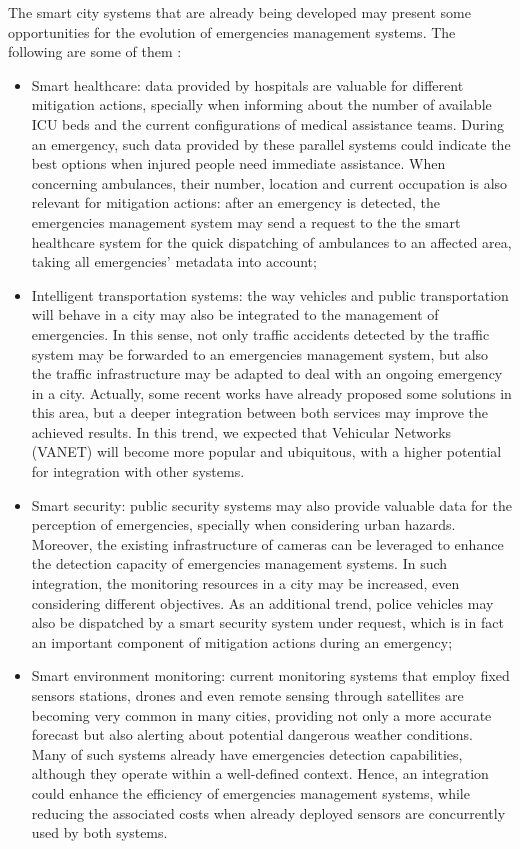 \begin{refsection}
The smart city systems that are already being developed may present some opportunities for the evolution of emergencies management systems. The following are some of them \cite{citiestransforming}:

\begin{itemize}
  \item Smart healthcare: data provided by hospitals are valuable for different mitigation actions, specially when informing about the number of available ICU beds and the current configurations of medical assistance teams. During an emergency, such data provided by these parallel systems could indicate the best options when injured people need immediate assistance. When concerning ambulances, their number, location and current occupation is also relevant for mitigation actions: after an emergency is detected, the emergencies management system may send a request to the the smart healthcare system for the quick dispatching of ambulances to an affected area, taking all emergencies' metadata into account;
  
  \item Intelligent transportation systems: the way vehicles and public transportation will behave in a city may also be integrated to the management of emergencies. In this sense, not only traffic accidents detected by the traffic system may be forwarded to an emergencies management system, but also the traffic infrastructure may be adapted to deal with an ongoing emergency in a city. Actually, some recent works have already proposed some solutions in this area, but a deeper integration between both services may improve the achieved results. In this trend, we expected that Vehicular Networks (VANET) will become more popular and ubiquitous, with a higher potential for integration with other systems.

  \item Smart security: public security systems may also provide valuable data for the perception of emergencies, specially when considering urban hazards. Moreover, the existing infrastructure of cameras can be leveraged to enhance the detection capacity of emergencies management systems. In such integration, the monitoring resources in a city may be increased, even considering different objectives. As an additional trend, police vehicles may also be dispatched by a smart security system under request, which is in fact an important component of mitigation actions during an emergency;
  
  \item Smart environment monitoring: current monitoring systems that employ fixed sensors stations, drones and even remote sensing through satellites are becoming very common in many cities, providing not only a more accurate forecast but also alerting about potential dangerous weather conditions. Many of such systems already have emergencies detection capabilities, although they operate within a well-defined context. Hence, an integration could enhance the efficiency of emergencies management systems, while reducing the associated costs when already deployed sensors are concurrently used by both systems.
\end{itemize}


\end{refsection}
